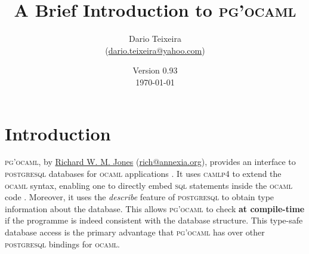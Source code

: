 \documentclass[11pt]{article}
\makeatletter
\newcommand{\ocaml}{\textsc{ocaml}\xspace}
\newcommand{\postgresql}{\textsc{postgresql}\xspace}
\newcommand{\sql}{\textsc{sql}\xspace}
\newcommand{\pgocaml}{\textsc{pg'ocaml}\xspace}
\newcommand{\camlp}{\textsc{camlp}{\scriptsize 4}\xspace}
\newcommand{\jonesemail}{rich@annexia.org}
\newcommand{\jones}{\href{mailto:\jonesemail}{Richard W. M. Jones} (\href{mailto:\jonesemail}{\jonesemail})}
\makeatother
\begin{document}
\renewcommand{\thefootnote}{\fnsymbol{footnote}}

\title{A Brief Introduction to \pgocaml\footnotemark[1]}
\author{Dario Teixeira\\\small(\href{mailto:dario.teixeira@yahoo.com}{dario.teixeira@yahoo.com})}
\date{Version 0.93\\\today}
\maketitle


\renewcommand{\thefootnote}{\arabic{footnote}}

\tableofcontents



\section{Introduction}
\label{sec:intro}

\pgocaml, by \jones, provides an interface to \postgresql databases for \ocaml
applications \cite{pgocaml,postgresql,ocaml}.  It uses \camlp to extend the
\ocaml syntax, enabling one to directly embed \sql statements inside the \ocaml
code \cite{camlp}.  Moreover, it uses the \emph{describe} feature of \postgresql to
obtain type information about the database.  This allows \pgocaml to check \textbf{at
compile-time} if the programme is indeed consistent with the database structure.
This type-safe database access is the primary advantage that \pgocaml has over other
\postgresql bindings for \ocaml.
\end{document}
